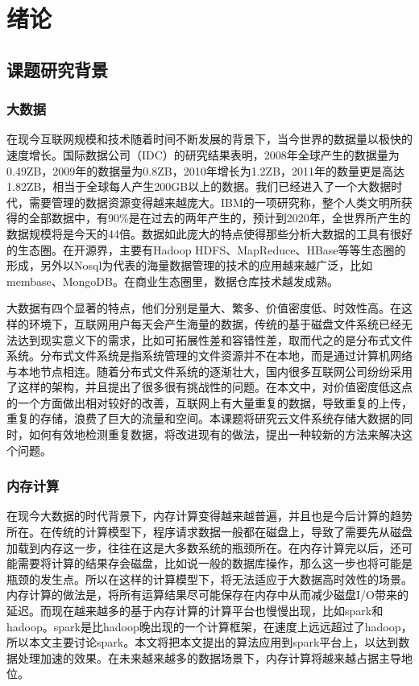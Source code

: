 
\chapter{绪论}
\label{chap:intro}

\section{课题研究背景}
\label{sec:backgroud}

\subsection{大数据}
在现今互联网规模和技术随着时间不断发展的背景下，当今世界的数据量以极快的速度增长。国际数据公司（IDC）的研究结果表明，2008年全球产生的数据量为0.49ZB，2009年的数据量为0.8ZB，2010年增长为1.2ZB，2011年的数量更是高达1.82ZB，相当于全球每人产生200GB以上的数据。我们已经进入了一个大数据时代，需要管理的数据资源变得越来越庞大。IBM的一项研究称，整个人类文明所获得的全部数据中，有90\%是在过去的两年产生的，预计到2020年，全世界所产生的数据规模将是今天的44倍。数据如此庞大的特点使得那些分析大数据的工具有很好的生态圈。在开源界，主要有Hadoop HDFS、MapReduce、HBase等等生态圈的形成，另外以Nosql为代表的海量数据管理的技术的应用越来越广泛，比如membase、MongoDB。在商业生态圈里，数据仓库技术越发成熟。

大数据有四个显著的特点，他们分别是量大、繁多、价值密度低、时效性高。在这样的环境下，互联网用户每天会产生海量的数据，传统的基于磁盘文件系统已经无法达到现实意义下的需求，比如可拓展性差和容错性差，取而代之的是分布式文件系统。分布式文件系统是指系统管理的文件资源并不在本地，而是通过计算机网络与本地节点相连。随着分布式文件系统的逐渐壮大，国内很多互联网公司纷纷采用了这样的架构，并且提出了很多很有挑战性的问题。在本文中，对价值密度低这点的一个方面做出相对较好的改善，互联网上有大量重复的数据，导致重复的上传，重复的存储，浪费了巨大的流量和空间。本课题将研究云文件系统存储大数据的同时，如何有效地检测重复数据，将改进现有的做法，提出一种较新的方法来解决这个问题。

\subsection{内存计算}
在现今大数据的时代背景下，内存计算变得越来越普遍，并且也是今后计算的趋势所在。在传统的计算模型下，程序请求数据一般都在磁盘上，导致了需要先从磁盘加载到内存这一步，往往在这是大多数系统的瓶颈所在。在内存计算完以后，还可能需要将计算的结果存会磁盘，比如说一般的数据库操作，那么这一步也将可能是瓶颈的发生点。所以在这样的计算模型下，将无法适应于大数据高时效性的场景。内存计算的做法是，将所有运算结果尽可能保存在内存中从而减少磁盘I/O带来的延迟。而现在越来越多的基于内存计算的计算平台也慢慢出现，比如spark和hadoop。spark是比hadoop晚出现的一个计算框架，在速度上远远超过了hadoop，所以本文主要讨论spark。本文将把本文提出的算法应用到spark平台上，以达到数据处理加速的效果。在未来越来越多的数据场景下，内存计算将越来越占据主导地位。

